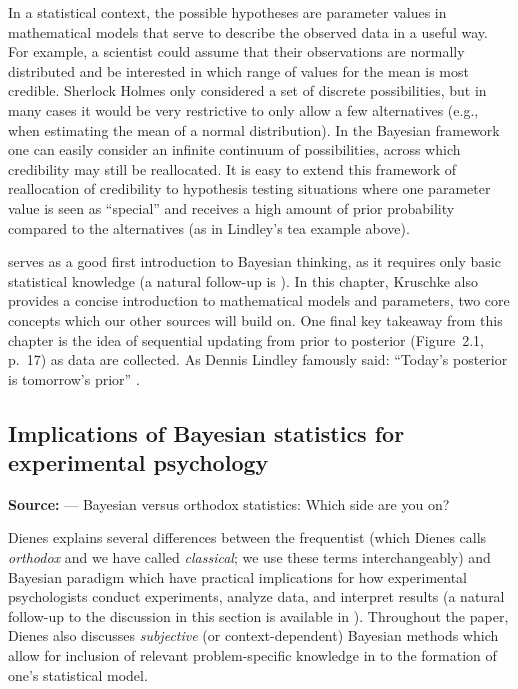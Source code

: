In a statistical context, the possible hypotheses are parameter values in mathematical models that serve to describe the observed data in a useful way.
For example, a scientist could assume that their observations are normally distributed and be interested in which range of values for the mean is most credible. 
Sherlock Holmes only considered a set of discrete possibilities, but in many cases it would be very restrictive to only allow a few alternatives (e.g., when estimating the mean of a normal distribution).
In the Bayesian framework one can easily consider an infinite continuum of possibilities, across which credibility may still be reallocated. It is easy to extend this framework of reallocation of credibility to hypothesis testing situations where one parameter value is seen as ``special'' and receives a high amount of prior probability compared to the alternatives (as in Lindley's tea example above).

 serves as a good first introduction to Bayesian thinking, as it requires only basic statistical knowledge (a natural follow-up is ).  In this chapter, Kruschke also provides a concise introduction to mathematical models and parameters, two core concepts which our other sources will build on.
One final key takeaway from this chapter is the idea of sequential updating from prior to posterior (Figure~2.1, p.~17) as data are collected.
As Dennis Lindley famously said: ``Today’s posterior is tomorrow’s prior'' \cite[p.~2]{Lindley1972}.

\subsection{Implications of Bayesian statistics for experimental psychology}
\noindent\textbf{Source:}  --- Bayesian versus orthodox statistics: Which side are you on? 
\vspace{2mm}

Dienes explains several differences between the frequentist (which Dienes calls \textit{orthodox} and we have called \textit{classical}; we use these terms interchangeably) and Bayesian paradigm which have practical implications for how experimental psychologists conduct experiments, analyze data, and interpret results (a natural follow-up to the discussion in this section is available in ).
Throughout the paper, Dienes also discusses \textit{subjective} (or context-dependent) Bayesian methods which allow for inclusion of relevant problem-specific knowledge in to the formation of one's statistical model. 

